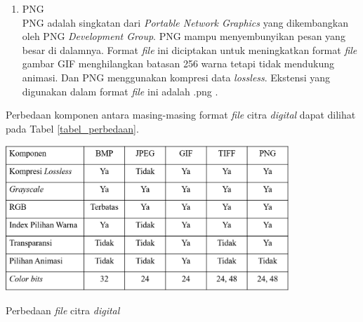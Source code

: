\begin{enumerate}
			\item PNG\\
			PNG adalah singkatan dari \emph{Portable Network Graphics} yang dikembangkan oleh PNG \emph{Development Group}. PNG mampu menyembunyikan pesan yang besar di dalamnya. Format \emph{file} ini diciptakan untuk meningkatkan format \emph{file} gambar GIF menghilangkan batasan 256 warna tetapi tidak mendukung animasi. Dan PNG menggunakan kompresi data \emph{lossless}. Ekstensi yang digunakan dalam format \emph{file} ini adalah .png \cite{gautam}.
		\end{enumerate}
	Perbedaan komponen antara masing-masing format \emph{file} citra \emph{digital} dapat dilihat pada Tabel \ref{tabel_perbedaan}. 
	\begin{table}[H]
		\centering
		\includegraphics[width=0.8\textwidth]{gambar/table_perbedaan}
		\caption{Perbedaan \emph{file} citra \emph{digital}}
		\label{tabel_perbedaan}
	\end{table}

